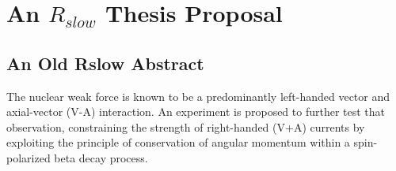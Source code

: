 


\clearpage	
\chapter{An $R_{slow}$ Thesis Proposal}




\section{An Old Rslow Abstract}
The nuclear weak force is known to be a predominantly left-handed vector and axial-vector (V-A) interaction.  An experiment is proposed to further test that observation, constraining the strength of right-handed (V+A) currents by exploiting the principle of conservation of angular momentum within a spin-polarized beta decay process.  




